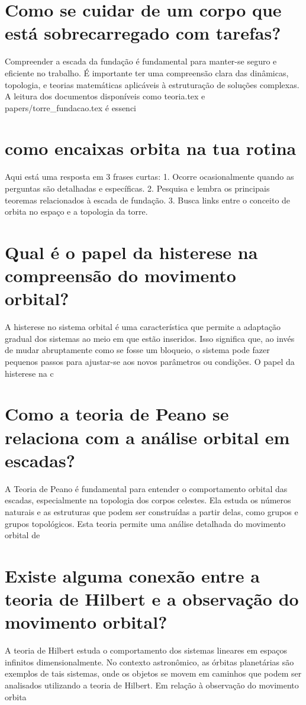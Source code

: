 \documentclass[11pt,a4paper]{article}
\begin{document}
\section{Como se cuidar de um corpo que está sobrecarregado com tarefas?}
Compreender a escada da fundação é fundamental para manter-se seguro e eficiente no trabalho. É importante ter uma compreensão clara das dinâmicas, topologia, e teorias matemáticas aplicáveis à estruturação de soluções complexas. A leitura dos documentos disponíveis como teoria.tex e papers/torre\_fundacao.tex é essenci

\section{como encaixas orbita na tua rotina}
Aqui está uma resposta em 3 frases curtas: 1. Ocorre ocasionalmente quando as perguntas são detalhadas e específicas. 2. Pesquisa e lembra os principais teoremas relacionados à escada de fundação. 3. Busca links entre o conceito de orbita no espaço e a topologia da torre.

\section{Qual é o papel da histerese na compreensão do movimento orbital?}
A histerese no sistema orbital é uma característica que permite a adaptação gradual dos sistemas ao meio em que estão inseridos. Isso significa que, ao invés de mudar abruptamente como se fosse um bloqueio, o sistema pode fazer pequenos passos para ajustar-se aos novos parâmetros ou condições. O papel da histerese na c

\section{Como a teoria de Peano se relaciona com a análise orbital em escadas?}
A Teoria de Peano é fundamental para entender o comportamento orbital das escadas, especialmente na topologia dos corpos celestes. Ela estuda os números naturais e as estruturas que podem ser construídas a partir delas, como grupos e grupos topológicos. Esta teoria permite uma análise detalhada do movimento orbital de 

\section{Existe alguma conexão entre a teoria de Hilbert e a observação do movimento orbital?}
A teoria de Hilbert estuda o comportamento dos sistemas lineares em espaços infinitos dimensionalmente. No contexto astronômico, as órbitas planetárias são exemplos de tais sistemas, onde os objetos se movem em caminhos que podem ser analisados utilizando a teoria de Hilbert. Em relação à observação do movimento orbita
\end{document}
